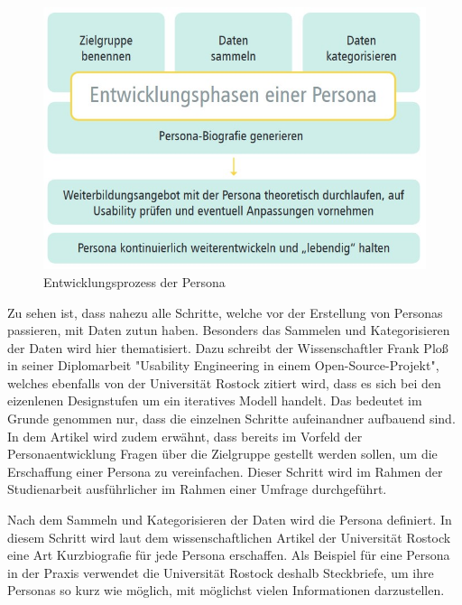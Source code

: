 \begin{figure}[h]
    \centering
    \includegraphics[width=1\textwidth]{images/03/entwicklungPersona.jpg}
    \caption{Entwicklungsprozess der Persona \cite{personamethode}}
    \label{personaEntwicklungsPhasen}
\end{figure}

Zu sehen ist, dass nahezu alle Schritte, welche vor der Erstellung von Personas passieren, mit Daten zutun haben. Besonders das Sammelen und Kategorisieren der Daten wird hier thematisiert.\cite{personamethode} Dazu schreibt der Wissenschaftler Frank Ploß in seiner Diplomarbeit "Usability Engineering in einem Open-Source-Projekt", welches ebenfalls von der Universität Rostock zitiert wird, dass es sich bei den eizenlenen Designstufen um ein iteratives Modell handelt.\cite{osp:masterthesis}
Das bedeutet im Grunde genommen nur, dass die einzelnen Schritte aufeinandner aufbauend sind. In dem Artikel wird zudem erwähnt, dass bereits im Vorfeld der Personaentwicklung Fragen über die Zielgruppe gestellt werden sollen, um die Erschaffung einer Persona zu vereinfachen.\cite{personamethode}
Dieser Schritt wird im Rahmen der Studienarbeit ausführlicher im Rahmen einer Umfrage durchgeführt.

Nach dem Sammeln und Kategorisieren der Daten wird die Persona definiert.\cite{personamethode} In diesem Schritt wird laut dem wissenschaftlichen Artikel der Universität Rostock eine Art Kurzbiografie für jede Persona erschaffen.\cite{personamethode} Als Beispiel für eine Persona in der Praxis verwendet die Universität Rostock deshalb Steckbriefe, um ihre Personas so kurz wie möglich, mit möglichst vielen Informationen darzustellen.\cite{personamethode}

